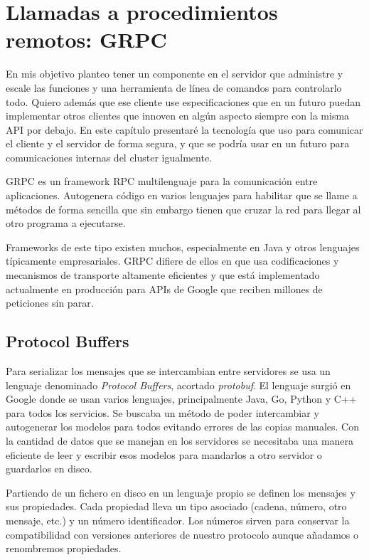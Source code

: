 \chapter{Llamadas a procedimientos remotos: GRPC}
\label{chap:grpc}

En mis objetivo planteo tener un componente en el servidor que administre y escale las funciones y una herramienta de línea de comandos para controlarlo todo. Quiero además que ese cliente use especificaciones que en un futuro puedan implementar otros clientes que innoven en algún aspecto siempre con la misma API por debajo. En este capítulo presentaré la tecnología que uso para comunicar el cliente y el servidor de forma segura, y que se podría usar en un futuro para comunicaciones internas del cluster igualmente.

GRPC es un framework RPC multilenguaje para la comunicación entre aplicaciones. Autogenera código en varios lenguajes para habilitar que se llame a métodos de forma sencilla que sin embargo tienen que cruzar la red para llegar al otro programa a ejecutarse.

Frameworks de este tipo existen muchos, especialmente en Java y otros lenguajes típicamente empresariales. GRPC difiere de ellos en que usa codificaciones y mecanismos de transporte altamente eficientes y que está implementado actualmente en producción para APIs de Google que reciben millones de peticiones sin parar.

\section{Protocol Buffers}
\label{sec:protobuf}

Para serializar los mensajes que se intercambian entre servidores se usa un lenguaje denominado \emph{Protocol Buffers}, acortado \emph{protobuf}. El lenguaje surgió en Google donde se usan varios lenguajes, principalmente Java, Go, Python y C++ para todos los servicios. Se buscaba un método de poder intercambiar y autogenerar los modelos para todos evitando errores de las copias manuales. Con la cantidad de datos que se manejan en los servidores se necesitaba una manera eficiente de leer y escribir esos modelos para mandarlos a otro servidor o guardarlos en disco.

Partiendo de un fichero en disco en un lenguaje propio se definen los mensajes y sus propiedades. Cada propiedad lleva un tipo asociado (cadena, número, otro mensaje, etc.) y un número identificador. Los números sirven para conservar la compatibilidad con versiones anteriores de nuestro protocolo aunque añadamos o renombremos propiedades.


